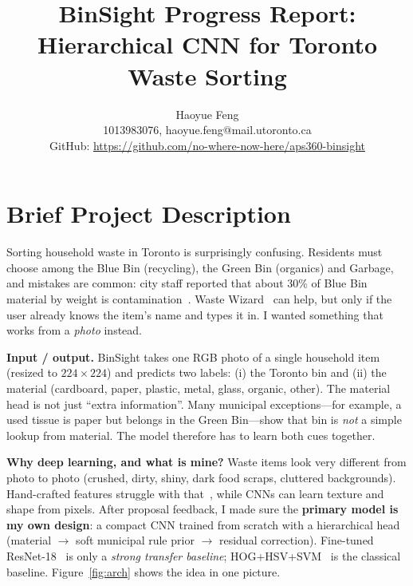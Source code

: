 \documentclass[final]{article}
\title{BinSight Progress Report: Hierarchical CNN for Toronto Waste Sorting}
\author{%
  Haoyue Feng \\
  1013983076, haoyue.feng@mail.utoronto.ca\\
  GitHub: \url{https://github.com/no-where-now-here/aps360-binsight}\\
}
\begin{document}
\maketitle
\vspace{-0.55in}

\section*{Brief Project Description}
Sorting household waste in Toronto is surprisingly confusing. Residents must choose among the Blue Bin (recycling), the Green Bin (organics) and Garbage, and mistakes are common: city staff reported that about 30\% of Blue Bin material by weight is contamination~\cite{toronto2023}. Waste Wizard~\cite{wastewizard} can help, but only if the user already knows the item's name and types it in. I wanted something that works from a \emph{photo} instead.

\textbf{Input / output.} BinSight takes one RGB photo of a single household item (resized to $224\times224$) and predicts two labels: (i) the Toronto bin and (ii) the material (cardboard, paper, plastic, metal, glass, organic, other). The material head is not just ``extra information''. Many municipal exceptions---for example, a used tissue is paper but belongs in the Green Bin---show that bin is \emph{not} a simple lookup from material. The model therefore has to learn both cues together.

\textbf{Why deep learning, and what is mine?} Waste items look very different from photo to photo (crushed, dirty, shiny, dark food scraps, cluttered backgrounds). Hand-crafted features struggle with that~\cite{thung2016}, while CNNs can learn texture and shape from pixels. After proposal feedback, I made sure the \textbf{primary model is my own design}: a compact CNN trained from scratch with a hierarchical head (material $\to$ soft municipal rule prior $\to$ residual correction). Fine-tuned ResNet-18~\cite{he2016} is only a \emph{strong transfer baseline}; HOG+HSV+SVM~\cite{dalal2005} is the classical baseline. Figure~\ref{fig:arch} shows the idea in one picture.
\end{document}
